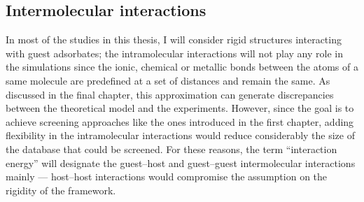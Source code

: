 \documentclass[main.tex]{subfiles}
\begin{document}
\subsection{Intermolecular interactions}\label{sct:interaction}

In most of the studies in this thesis, I will consider rigid structures interacting with guest adsorbates; the intramolecular interactions will not play any role in the simulations since the ionic, chemical or metallic  bonds between the atoms of a same molecule are predefined at a set of distances and remain the same. As discussed in the final chapter, this approximation can generate discrepancies between the theoretical model and the experiments. However, since the goal is to achieve screening approaches like the ones introduced in the first chapter, adding flexibility in the intramolecular interactions would reduce considerably the size of the database that could be screened. For these reasons, the term ``interaction energy'' will designate the guest--host and guest--guest intermolecular interactions mainly --- host--host interactions would compromise the assumption on the rigidity of the framework.
\end{document}
